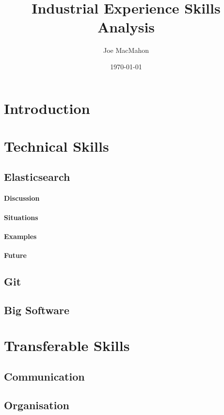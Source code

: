 \documentclass[a4paper, 12pt]{article} %
\title{Industrial Experience Skills Analysis}
\author{Joe MacMahon}
\date{\today}
\begin{document}
\maketitle

\section{Introduction}
\label{sec:intro}

\section{Technical Skills}
\label{sec:technical}

\subsection{Elasticsearch}
\label{sec:technical.elasticsearch}

\paragraph{Discussion}

\paragraph{Situations}

\paragraph{Examples}

\paragraph{Future}

\subsection{Git}
\label{sec:technical.git}

\subsection{Big Software}
\label{sec:technical.bigsoftware}

\section{Transferable Skills}
\label{sec:transferable}

\subsection{Communication}
\label{sec:transferable.communication}

\subsection{Organisation}
\label{sec:transferable.organisation}
\end{document}
